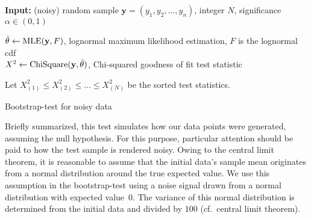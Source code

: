 \begin{algorithm}[htb]
	\textbf{Input:} (noisy) random sample $\mathbf{y}=(y_1, y_2, \dots, y_n)$, integer $N$, significance $\alpha\in (0,1)$\\
	\BlankLine
	
	$\hat{\theta}\leftarrow \textnormal{MLE}(\mathbf{y}, F)$, lognormal maximum likelihood estimation, $F$ is the lognormal cdf\\
	$X^2 \leftarrow \textnormal{ChiSquare}(\mathbf{y}, \hat{\theta})$, Chi-squared goodness of fit test statistic\\
	
	
	
	Let $X^2_{(1)}\leq X^2_{(2)}\leq \dots \leq X^2_{(N)}$ be the sorted test statistics.\\
	
	
	\caption{Bootstrap-test for noisy data}
	\label{algo:bootstrap}
\end{algorithm}

Briefly summarized, this test simulates how our data points were generated, assuming the null hypothesis. For this purpose, particular attention should be paid to how the test sample is rendered noisy. Owing to the central limit theorem, it is reasonable to assume that the initial data's sample mean originates from a normal distribution around the true expected value.  We use this assumption in the bootstrap-test using a noise signal drawn from a normal distribution with expected value~$0$. The variance of this normal distribution is determined from the initial data and divided by $100$ (cf.\ central limit theorem). %

